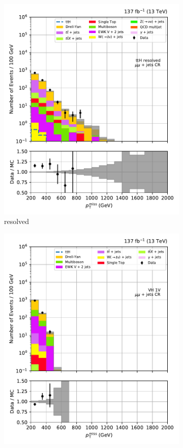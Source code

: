 \begin{figure}[htbp]
\begin{subfigure}[b]{0.24\textwidth}
        \includegraphics[width=\textwidth]{figures/region_plots/full_Run2/region_2/ttH_resolved.pdf}
        \caption{\ttH resolved}
    \end{subfigure}
    \hfill
    \begin{subfigure}[b]{0.24\textwidth}
        \includegraphics[width=\textwidth]{figures/region_plots/full_Run2/region_2/VH_1V.pdf}

\end{subfigure}
\end{figure}
